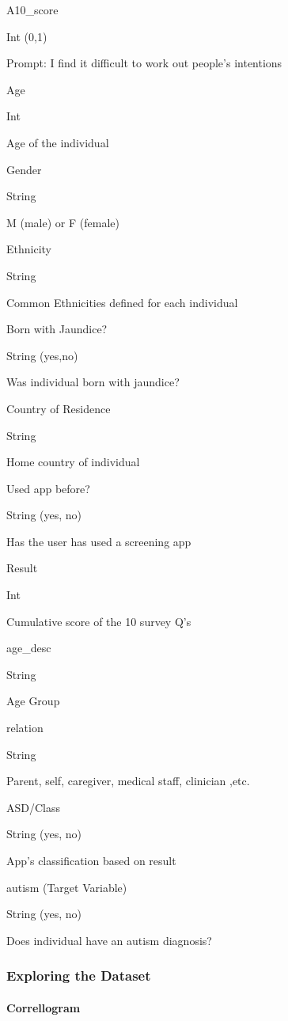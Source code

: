 \documentclass[
]{article}
\begin{document}
A10\_score

Int (0,1)

Prompt: I find it difficult to work out people's intentions

Age

Int

Age of the individual

Gender

String

M (male) or F (female)

Ethnicity

String

Common Ethnicities defined for each individual

Born with Jaundice?

String (yes,no)

Was individual born with jaundice?

Country of Residence

String

Home country of individual

Used app before?

String (yes, no)

Has the user has used a screening app

Result

Int

Cumulative score of the 10 survey Q's

age\_desc

String

Age Group

relation

String

Parent, self, caregiver, medical staff, clinician ,etc.

ASD/Class

String (yes, no)

App's classification based on result

autism (Target Variable)

String (yes, no)

Does individual have an autism diagnosis?

\hypertarget{exploring-the-dataset}{%
\subsubsection{Exploring the Dataset}\label{exploring-the-dataset}}

\hypertarget{correllogram}{%
\paragraph{Correllogram}\label{correllogram}}
\end{document}
